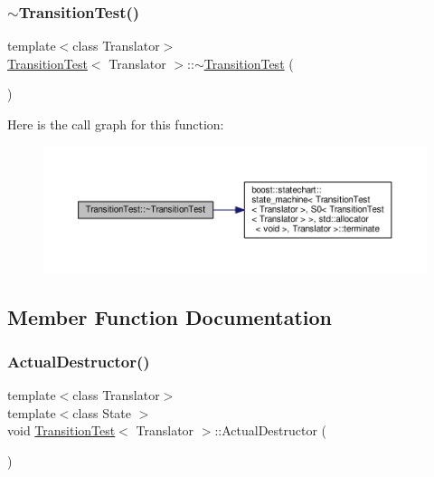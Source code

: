 \mbox{\label{struct_transition_test_a96b869f3eb379097b3178b5ed19478cc}} 
\subsubsection{\texorpdfstring{$\sim$\+Transition\+Test()}{~TransitionTest()}}
{\footnotesize\ttfamily template$<$class Translator$>$ \\
\mbox{\hyperlink{struct_transition_test}{Transition\+Test}}$<$ Translator $>$\+::$\sim$\mbox{\hyperlink{struct_transition_test}{Transition\+Test}} (\begin{DoxyParamCaption}{ }\end{DoxyParamCaption})\hspace{0.3cm}{\ttfamily [inline]}}

Here is the call graph for this function\+:
\nopagebreak
\begin{figure}[H]
\begin{center}
\leavevmode
\includegraphics[width=350pt]{struct_transition_test_a96b869f3eb379097b3178b5ed19478cc_cgraph}
\end{center}
\end{figure}


\subsection{Member Function Documentation}
\mbox{\label{struct_transition_test_a3088a0f806fabd51691071dd45b00d7c}} 
\subsubsection{\texorpdfstring{Actual\+Destructor()}{ActualDestructor()}}
{\footnotesize\ttfamily template$<$class Translator$>$ \\
template$<$class State $>$ \\
void \mbox{\hyperlink{struct_transition_test}{Transition\+Test}}$<$ Translator $>$\+::Actual\+Destructor (\begin{DoxyParamCaption}{ }\end{DoxyParamCaption})\hspace{0.3cm}{\ttfamily [inline]}}

